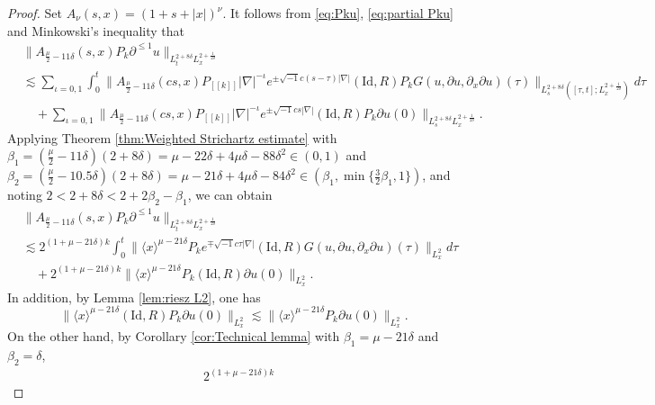 \documentclass[11pt,twoside]{article}
\def\f{\frac}
\def\p{\partial}
\def\ls{\lesssim}
\newcommand{\w}[1]{\langle {#1} \rangle}
\theoremstyle{plain}
\theoremstyle{definition}
\numberwithin{equation}{section}
\begin{document}
\begin{proof}
	Set $A_\nu(s,x)=(1+s+|x|)^{\nu}$. It follows from \eqref{eq:Pku}, \eqref{eq:partial Pku} and Minkowski's inequality that
	\begin{equation*}
		\begin{split}
			&\|A_{\f{\mu}{2}-11\delta}(s,x)P_k\p^{\le 1} u\|_{L_t^{2+8\delta}L^{2+\f{1}{2\delta}}_x}\\
			&\ls
			\sum_{\iota = 0,1}\int_{0}^{t} \big\| A_{\f{\mu}{2}-11\delta}(cs,x)P_{[[k]]}|\nabla|^{-\iota}e^{\pm \sqrt{-1}c(s-\tau)|\nabla|}  (\mathrm{Id},R)
			P_k G(u,\partial u,\p_x\p u)(\tau)\big\|_{L^{2+8\delta}_s([\tau,t];L^{2+\f{1}{2\delta}}_x)}d\tau\\
			&\quad+\sum_{\iota = 0,1}\| A_{\f{\mu}{2}-11\delta}(cs,x)P_{[[k]]}|\nabla|^{-\iota}e^{\pm \sqrt{-1}cs|\nabla|}(\mathrm{Id},R) P_k\partial u(0)\|_{L_s^{2+8\delta}L^{2+\f{1}{2\delta}}_x}.
		\end{split}
	\end{equation*}
	Applying Theorem \ref{thm:Weighted Strichartz estimate} with $\beta_1 = (\f{\mu}{2}-11\delta)(2+8\delta)=\mu-22\delta+4\mu\delta-88\delta^2\in(0,1)$ and $\beta_2 = (\f{\mu}{2}-10.5\delta)(2+8\delta)=\mu-21\delta+4\mu\delta-84\delta^2\in(\beta_1,\min\{\f32\beta_1,1\})$,
	and noting $2<2+8\delta<2+2\beta_2-\beta_1$, we can obtain
	\begin{equation}\label{3.134}
		\begin{split}
			&\|A_{\f{\mu}{2}-11\delta}(s,x)P_k\p^{\le 1} u\|_{L_t^{2+8\delta}L^{2+\f{1}{2\delta}}_x}\\
			&\ls
			2^{ (1+\mu-21\delta) k}
			\int_{0}^{t}\big\|\w{x}^{\mu-21\delta}P_ke^{\mp \sqrt{-1}c\tau|\nabla|} (\mathrm{Id},R) G(u,\partial u,\p_x\p u)(\tau)\big\|_{L^2_x}d\tau\\
			&\quad+2^{ (1+\mu-21\delta) k}
			\|\w{x}^{\mu-21\delta}P_k(\mathrm{Id},R)\partial u(0)\|_{L^2_x}.
		\end{split}
	\end{equation}
	In addition, by Lemma \ref{lem:riesz L2}, one has
	\begin{equation}\label{3.135}
		\|\w{x}^{\mu-21\delta}(\mathrm{Id},R)P_k\partial u(0)\|_{L^2_x}
		\ls
		\|\w{x}^{\mu-21\delta}P_k\partial u(0)\|_{L^2_x}.
	\end{equation}
	On the other hand, by Corollary \ref{cor:Technical lemma} with $\beta_1 =\mu-21\delta$ and $\beta_2 = \delta$,
	\begin{equation*}
		\begin{split}
			&2^{ (1+\mu-21\delta) k}

\end{split}
\end{equation*}
\end{proof}
\end{document}
